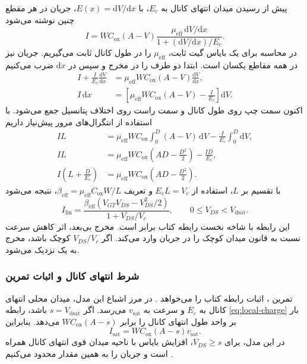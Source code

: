 پیش از رسیدن میدان انتهای کانال به \(E_c\)، با
\(E(x)=\mathrm{d}V/\mathrm{d}x\)، جریان در هر مقطع چنین نوشته می‌شود
\begin{equation}
 I=WC_{\mathrm{ox}}(A-V)
 \frac{\mu_{\mathrm{eff}}\,\mathrm{d}V/\mathrm{d}x}
 {1+(\mathrm{d}V/\mathrm{d}x)/E_c}.
 \label{eq:current-local}
\end{equation}
در محاسبه برای یک بایاس گیت ثابت، \(\mu_{\mathrm{eff}}\) را در طول کانال
ثابت می‌گیریم. جریان  نیز در همه مقاطع یکسان است. ابتدا دو طرف را
در مخرج و سپس در \(\mathrm{d}x\) ضرب می‌کنیم
\begin{align*}
 I+\frac{I}{E_c}\frac{\mathrm{d}V}{\mathrm{d}x}
 &=\mu_{\mathrm{eff}}WC_{\mathrm{ox}}(A-V)
 \frac{\mathrm{d}V}{\mathrm{d}x},\\
 I\,\mathrm{d}x
 &=\left[\mu_{\mathrm{eff}}WC_{\mathrm{ox}}(A-V)-\frac{I}{E_c}\right]
 \mathrm{d}V.
\end{align*}
اکنون سمت چپ روی طول کانال و سمت راست روی اختلاف پتانسیل جمع می‌شود.
با استفاده از انتگرال‌های مرور پیش‌نیاز داریم
\begin{align*}
 IL&=\mu_{\mathrm{eff}}WC_{\mathrm{ox}}
 \int_0^D(A-V)\,\mathrm{d}V-\frac{I}{E_c}\int_0^D\mathrm{d}V,\\
 IL&=\mu_{\mathrm{eff}}WC_{\mathrm{ox}}\left(AD-\frac{D^2}{2}\right)
 -\frac{ID}{E_c},\\
 I\left(L+\frac{D}{E_c}\right)
 &=\mu_{\mathrm{eff}}WC_{\mathrm{ox}}\left(AD-\frac{D^2}{2}\right).
\end{align*}
با تقسیم بر \(L\)، استفاده از \(E_cL=V_c\) و تعریف
\(\beta_{\mathrm{eff}}=\mu_{\mathrm{eff}}C_{\mathrm{ox}}W/L\)، نتیجه می‌شود
\begin{equation}
 \boxed{I_{\mathrm{lin}}=
 \frac{\beta_{\mathrm{eff}}\left(V_{GT}V_{DS}-V_{DS}^2/2\right)}
 {1+V_{DS}/V_c}},\qquad 0\le V_{DS}<V_{\mathrm{dsat}}.
 \label{eq:high-field-linear}
\end{equation}
این رابطه با شاخه نخست رابطه  کتاب برابر است. مخرج بی‌بعد،
اثر کاهش سرعت نسبت به قانون میدان کوچک را در جریان وارد می‌کند. اگر
\(V_{DS}/V_c\) کوچک باشد، مخرج به یک نزدیک می‌شود.

\subsubsection*{شرط انتهای کانال و اثبات تمرین }
تمرین ، اثبات رابطه  کتاب را می‌خواهد
\cite[صفحه چاپی ۹۶]{weste}. در مرز اشباع این مدل، میدان محلی انتهای کانال
به \(E_c\) و سرعت به \(v_{\mathrm{sat}}\) می‌رسد. اگر
\(s=V_{\mathrm{dsat}}\) باشد، رابطه \eqref{eq:local-charge} بار بر واحد
طول انتهای کانال را برابر \(WC_{\mathrm{ox}}(A-s)\) می‌دهد. بنابراین
\begin{equation}
 I_{\mathrm{sat}}=WC_{\mathrm{ox}}(A-s)v_{\mathrm{sat}}.
 \label{eq:drain-saturation-current}
\end{equation}
در این مدل، برای \(V_{DS}\ge s\)، افزایش بایاس  با ناحیه
میدان قوی انتهای کانال همراه است و جریان را به همین مقدار محدود می‌کنیم
\cite[رابطه ]{weste}.

